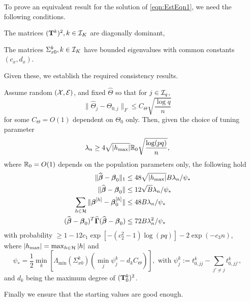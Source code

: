 To prove an equivalent result for the solution of \eqref{eqn:EstEqn1}, we need the following conditions.

\vspace{1em}
 The matrices $({\mathbf{T}}^k)^2, k \in {\cal{I}}_K$ are diagonally dominant,

 The matrices $\Sigma_{x0}^k, k \in {\cal{I}}_K$ have bounded eigenvalues with common constants $(c_x, d_x)$.
\vspace{1em}
%

\noindent Given these, we establish the required consistency results.

\begin{Theorem}\label{thm:thm-B}
Assume random $({\cal{X}}, {\cal{E}})$, and fixed $\widehat \Theta$ so that for $j \in {\cal{I}}_q$,
%
\[
\| \widehat \Theta_j - \Theta_{0,j} \|_F \leq C_\Theta \sqrt{\frac{\log q}{n}}
\]
%
for some $C_\Theta = O(1)$ dependent on $\Theta_0$ only. Then, given the choice of tuning parameter
%
$$
\lambda_n \geq 4 \sqrt{| h_{\max} |} {\mathbb{R}}_0 \sqrt{ \frac{ \log(pq)}{n}},
$$
%
where ${\mathbb{R}}_0 = O(1)$ depends on the population parameters only, the following hold
%
\begin{align}
\| \widehat {{\boldsymbol{\beta}}} - {\boldsymbol{\beta}}_0 \|_1 & \leq 48 \sqrt{ | h_{\max} |} B \lambda_n / \psi_* \label{eqn:BetaThmEqn1}\\
\| \widehat {{\boldsymbol{\beta}}} - {\boldsymbol{\beta}}_0 \| & \leq 12 \sqrt B \lambda_n / \psi_* \label{eqn:BetaThmEqn2}\\
\sum_{h \in {\cal{H}}} \| {\boldsymbol{\beta}}^{[h]} - {\boldsymbol{\beta}}_0^{[h]} \| & \leq 48 B \lambda_n / \psi_* \label{eqn:BetaThmEqn3}\\
(\widehat {{\boldsymbol{\beta}}} - {\boldsymbol{\beta}}_0 )^T \widehat {{\boldsymbol{\Gamma}}} (\widehat {{\boldsymbol{\beta}}} - {\boldsymbol{\beta}}_0 ) & \leq
72 B \lambda_n^2 / \psi_* \label{eqn:BetaThmEqn4}
\end{align}
%
with probability $\geq 1 - 12 c_1 \exp[-(c_2^2-1) \log(pq)] - 2 \exp( -c_3 n)$, where $|h_{\max}| = \max_{h \in {\cal{H}}} |h|$ and
%
$$
\psi_*= \frac{1}{2} \min_k \left[ \Lambda_{\min} (\Sigma_{x 0}^k) \left( \min_j \psi_j^k - d_k C_\Theta \right) \right],
\text{ with }
\psi_j^k := t_{0,jj}^k - \sum_{j' \neq j} t_{0,jj'}^k,
$$
%
and $d_k$ being the maximum degree of $({\mathbf{T}}_0^k)^2$.
\end{Theorem}

Finally we ensure that the starting values are good enough.

